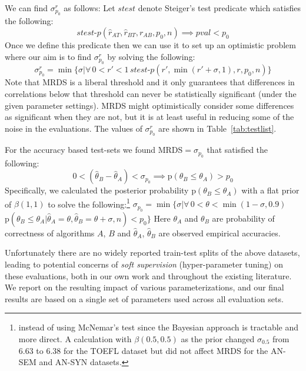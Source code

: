 \documentclass[11pt]{article}
\begin{document}
We can find $\sigma_{p_0}^r$ as follows: Let $\textit{stest}$
denote Steiger's test predicate which satisfies the following:
$$\textit{stest-p}(\hat{r}_{AT}, \hat{r}_{BT}, r_{AB}, p_0, n)
{\implies} \textit{pval} < p_0$$ Once we define this predicate then we
can use it to set up an optimistic problem where our aim is to find
$\sigma_{p_0}^r$ by solving the following: {\small $$\sigma_{p_0}^r =
  \min\{\sigma | \forall\, 0 {<} r' {<} 1\, \textit{stest-p}(r',
  \min(r'+\sigma, 1), r, p_0, n) \} $$} Note that MRDS is a liberal
threshold and it only guarantees that differences in correlations
below that threshold can never be statistically significant (under the
given parameter settings). MRDS might optimistically consider some
differences as significant when they are not, but it is at least
useful in reducing some of the noise in the evaluations.  The values
of $\sigma_{p_0}^r$ are shown in Table~\ref{tab:testlist}.

For the accuracy based test-sets we found MRDS$=\sigma_{p_0}$ that satisfied
the following:
{\small $$ 0< (\hat{\theta}_{B} - \hat{\theta}_{A})<\sigma_{p_0}
  {\implies} \text{p}(\theta_{B} \le \theta_{A}) > p_0$$}
Specifically, we calculated the posterior probability
$\text{p}(\theta_{B} \le \theta_{A})$ with a flat prior of
$\beta(1,1)$ to solve the following:\footnote{instead of using  McNemar's test
  \cite{mcnemar1947note} since the Bayesian approach is tractable and
  more direct. A calculation with $\beta(0.5, 0.5)$ as the prior
  changed $\sigma_{0.5}$ from 6.63 to 6.38 for the TOEFL dataset but
  did not affect MRDS for the AN-SEM and AN-SYN datasets.}
{\small $\sigma_{p_0}=\min\{\sigma |\forall\,
  0{<}\theta{<}\min(1{-}\sigma,0.9)\,$
  $\text{p}(\theta_{B}{\le} \theta_{A}| \hat{\theta}_A{=}\theta,
\hat{\theta}_B{=}\theta+\sigma, n) < p_0\}$}
Here $\theta_{A}$ and $\theta_{B}$ are probability of correctness of
algorithms $A$, $B$ and $\hat{\theta}_{A}$, $\hat{\theta}_{B}$ are
observed empirical accuracies.

Unfortunately there are no widely reported train-test splits of the
above datasets, leading to potential concerns of \emph{soft
  supervision} (hyper-parameter tuning) on these evaluations, both in
our own work and throughout the existing literature.  We report on the
resulting impact of various parameterizations, and our final results
are based on a single set of parameters used across all evaluation
sets.

\end{document}
